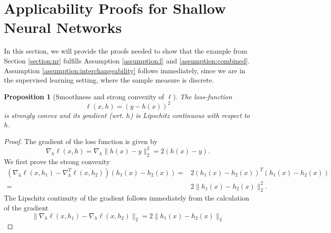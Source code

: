 \documentclass[10pt]{article} %
\newtheorem{proposition}{Proposition}
\begin{document}
\section{Applicability Proofs for Shallow Neural Networks}\label{appendix:snn}
In this section, we will provide the proofs needed to show that the example from Section \ref{section:nr} fulfills Assumption \ref{assumption:l} and \ref{assumption:combined}. Assumption \ref{assumption:interchangeability} follows immediately, since we are in the supervised learning setting, where the sample measure is discrete. 
\begin{proposition}[Smoothness and strong convexity of $\ell$]\label{prop:LipschitzExample}
The loss-function 
$$\ell(x,h)=(y-h(x))^2$$
is strongly convex and its gradient (wrt. $h$) is Lipschitz continuous with respect to $h$.
\end{proposition}
\begin{proof}
    The gradient of the loss function is given by 
    $$\nabla_h\ell(x,h)=\nabla_h\|h(x)-y\|^2_2=2(h(x)-y).$$
    We first prove the strong convexity
    \begin{align*}
        (\nabla_h \ell(x,h_1)-\nabla_h^T \ell(x,h_2))(h_1(x)-h_2(x))=&2(h_1(x)-h_2(x))^T(h_1(x)-h_2(x))\\
        =& 2\|h_1(x)-h_2(x)\|_2^2.
    \end{align*}
    The Lipschitz continuity of the gradient follows immediately from the calculation of the gradient
    $$\|\nabla_h\ell(x,h_1)-\nabla_h\ell(x,h_2)\|_2=2\|h_1(x)-h_2(x)\|_2$$
\end{proof}
\end{document}
